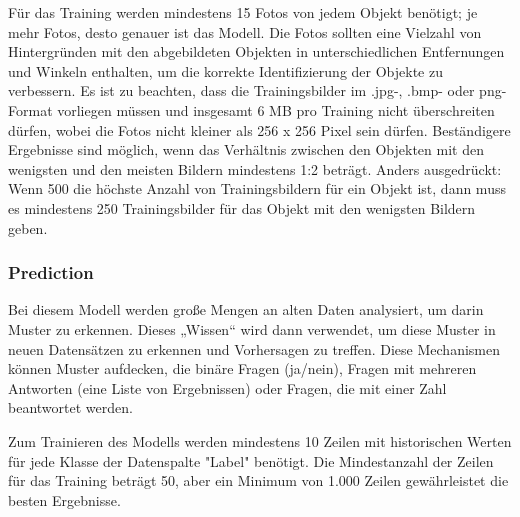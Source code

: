 Für das Training werden mindestens 15 Fotos von jedem Objekt benötigt; je mehr Fotos, desto genauer ist das Modell. Die Fotos sollten eine Vielzahl von Hintergründen mit den abgebildeten Objekten in unterschiedlichen Entfernungen und Winkeln enthalten, um die korrekte Identifizierung der Objekte zu verbessern. Es ist zu beachten, dass die Trainingsbilder im .jpg-, .bmp- oder png-Format vorliegen müssen und insgesamt 6 MB pro Training nicht überschreiten dürfen, wobei die Fotos nicht kleiner als 256 x 256 Pixel sein dürfen. Beständigere Ergebnisse sind möglich, wenn das Verhältnis zwischen den Objekten mit den wenigsten und den meisten Bildern mindestens 1:2 beträgt. Anders ausgedrückt: Wenn 500 die höchste Anzahl von Trainingsbildern für ein Objekt ist, dann muss es mindestens 250 Trainingsbilder für das Objekt mit den wenigsten Bildern geben.

\subsubsection{Prediction}

Bei diesem Modell werden große Mengen an alten Daten analysiert, um darin Muster zu erkennen. Dieses „Wissen“ wird dann verwendet, um diese Muster in neuen Datensätzen zu erkennen und Vorhersagen zu treffen. Diese Mechanismen können Muster aufdecken, die binäre Fragen (ja/nein), Fragen mit mehreren Antworten (eine Liste von Ergebnissen) oder Fragen, die mit einer Zahl beantwortet werden.

Zum Trainieren des Modells werden mindestens 10 Zeilen mit historischen Werten für jede Klasse der Datenspalte "Label" benötigt. Die Mindestanzahl der Zeilen für das Training beträgt 50, aber ein Minimum von 1.000 Zeilen gewährleistet die besten Ergebnisse.

